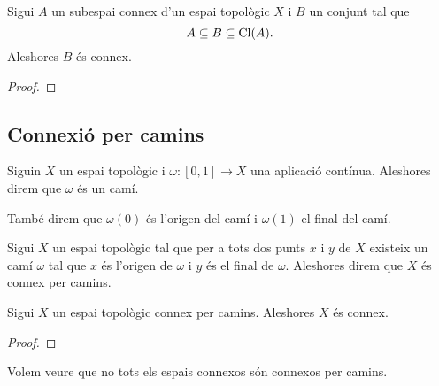 \documentclass[../Apunts.tex]{subfiles}
\begin{document}
	\begin{proposition}
		\label{prop:un conjunt inclós entre un connex i la seva clausura és connex}
		Sigui \(A\) un subespai connex d'un espai topològic \(X\) i \(B\) un conjunt tal que
		\[A\subseteq B\subseteq\operatorname{Cl}(A).\]
		Aleshores \(B\) és connex.
		\begin{proof}
		\end{proof}
	\end{proposition}
	\subsection{Connexió per camins}
	\begin{definition}[Camí]
		\label{de:camí}
		\label{def:orígen d'un camí}
		\label{def:final d'un camí}
		Siguin \(X\) un espai topològic i \(\omega\colon[0,1]\longrightarrow X\) una aplicació contínua. Aleshores direm que \(\omega\) és un camí.
		
		També direm que \(\omega(0)\) és l'origen del camí i \(\omega(1)\) el final del camí.
	\end{definition}
	\begin{definition}
		\label{connexió per camins}\label{def:connexió per camins}
		Sigui \(X\) un espai topològic tal que per a tots dos punts \(x\) i \(y\) de \(X\) existeix un camí \(\omega\) tal que \(x\) és l'origen de \(\omega\) i \(y\) és el final de \(\omega\). Aleshores direm que \(X\) és connex per camins.
	\end{definition}
	\begin{proposition}
		\label{prop:els connexos per camins són connexos}
		Sigui \(X\) un espai topològic connex per camins. Aleshores \(X\) és connex.
		\begin{proof}
		\end{proof}
	\end{proposition}
	\begin{example}
		\label{ex:no tots els espais connexos són connexos per camins}
		Volem veure que no tots els espais connexos són connexos per camins.
		\begin{solution}
		\end{solution}
	\end{example}
\end{document}
